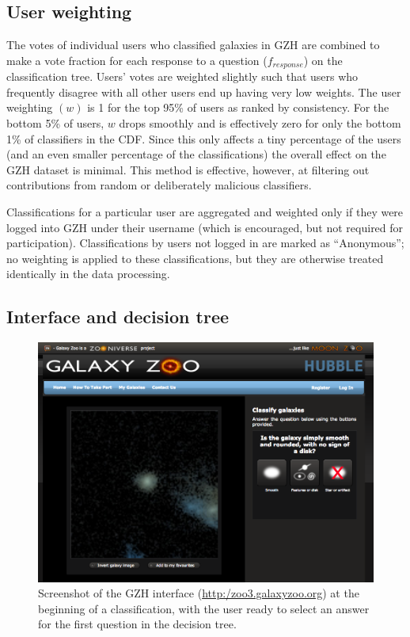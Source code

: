 \documentclass[twocolumn]{aastex6}
\begin{document}
\subsection{User weighting}\label{ssec:weighting}
The votes of individual users who classified galaxies in GZH are combined to make a vote fraction for each response to a question ($f_{response}$) on the classification tree. Users' votes are weighted slightly \citep[in a method identical to that described in][]{wil13} such that users who frequently disagree with all other users end up having very low weights. The user weighting $(w)$ is 1 for the top 95\% of users as ranked by consistency. For the bottom 5\% of users, $w$ drops smoothly and is effectively zero for only the bottom 1\% of classifiers in the CDF. Since this only affects a tiny percentage of the users (and an even smaller percentage of the classifications) the overall effect on the GZH dataset is minimal. This method is effective, however, at filtering out contributions from random or deliberately malicious classifiers.

Classifications for a particular user are aggregated and weighted only if they were logged into GZH under their username (which is encouraged, but not required for participation). Classifications by users not logged in are marked as ``Anonymous''; no weighting is applied to these classifications, but they are otherwise treated identically in the data processing. 

\subsection{Interface and decision tree}\label{ssec:interface}

\begin{figure}
\center
\includegraphics[width=160mm]{figures/gzh_interface.png}
\caption{Screenshot of the GZH interface (\url{http:/zoo3.galaxyzoo.org}) at the beginning of a classification, with the user ready to select an answer for the first question in the decision tree.\label{fig:interface}}
\end{figure}
\end{document}
